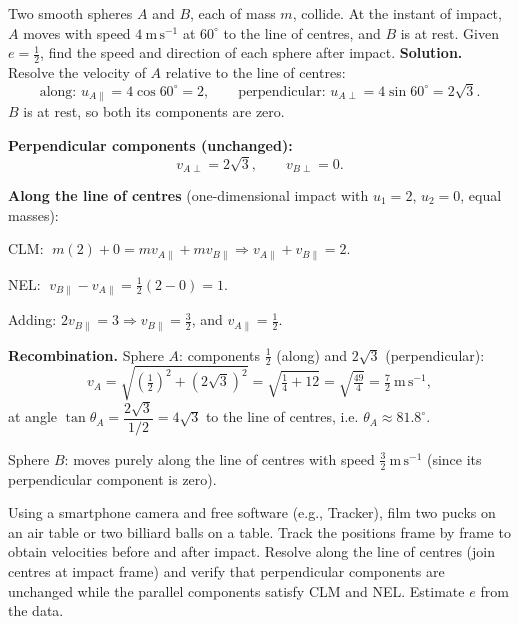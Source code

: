 \documentclass[11pt]{article}
\begin{document}
\begin{exoresolu}
Two smooth spheres $A$ and $B$, each of mass $m$, collide. At the instant of impact, $A$ moves with speed $4\ \mathrm{m\,s^{-1}}$ at $60^{\circ}$ to the line of centres, and $B$ is at rest. Given $e = \tfrac{1}{2}$, find the speed and direction of each sphere after impact.
\tcblower
\textbf{Solution.} Resolve the velocity of $A$ relative to the line of centres:
\[ \text{along: } u_{A\parallel} = 4\cos 60^{\circ} = 2, \qquad \text{perpendicular: } u_{A\perp} = 4\sin 60^{\circ} = 2\sqrt{3}. \]
$B$ is at rest, so both its components are zero.

\textbf{Perpendicular components (unchanged):}
\[ v_{A\perp} = 2\sqrt{3}, \qquad v_{B\perp} = 0. \]

\textbf{Along the line of centres} (one-dimensional impact with $u_1 = 2$, $u_2 = 0$, equal masses):

CLM: $\; m(2) + 0 = m v_{A\parallel} + m v_{B\parallel} \Rightarrow v_{A\parallel} + v_{B\parallel} = 2.$

NEL: $\; v_{B\parallel} - v_{A\parallel} = \tfrac{1}{2}(2 - 0) = 1.$

Adding: $2v_{B\parallel} = 3 \Rightarrow v_{B\parallel} = \tfrac{3}{2}$, and $v_{A\parallel} = \tfrac{1}{2}$.

\textbf{Recombination.} Sphere $A$: components $\tfrac{1}{2}$ (along) and $2\sqrt{3}$ (perpendicular):
\[ v_A = \sqrt{\left(\tfrac{1}{2}\right)^2 + (2\sqrt{3})^2} = \sqrt{\tfrac{1}{4} + 12} = \sqrt{\tfrac{49}{4}} = \tfrac{7}{2}\ \mathrm{m\,s^{-1}}, \]
at angle $\tan\theta_A = \dfrac{2\sqrt{3}}{1/2} = 4\sqrt{3}$ to the line of centres, i.e. $\theta_A \approx 81.8^{\circ}$.

Sphere $B$: moves purely along the line of centres with speed $\tfrac{3}{2}\ \mathrm{m\,s^{-1}}$ (since its perpendicular component is zero).
\end{exoresolu}

\begin{experience}
Using a smartphone camera and free software (e.g., Tracker), film two pucks on an air table or two billiard balls on a table. Track the positions frame by frame to obtain velocities before and after impact. Resolve along the line of centres (join centres at impact frame) and verify that perpendicular components are unchanged while the parallel components satisfy CLM and NEL. Estimate $e$ from the data.
\end{experience}
\end{document}
